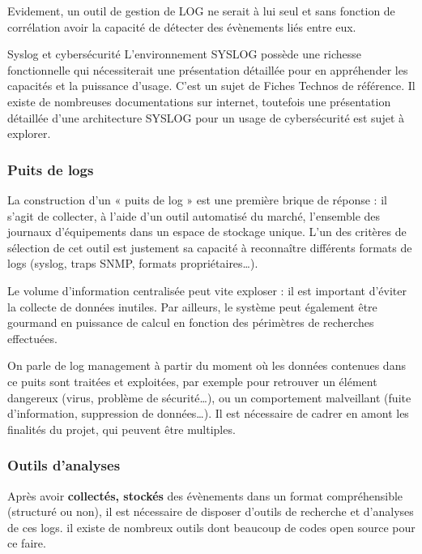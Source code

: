  Evidement, un outil de gestion de LOG ne serait à lui seul et sans fonction de corrélation avoir la capacité de détecter des évènements liés entre eux. 
 
\begin{warningbox}{Syslog et cybersécurité}
	L'environnement SYSLOG possède une richesse fonctionnelle qui nécessiterait une présentation détaillée pour en appréhender les capacités et la puissance d'usage. C'est un sujet de Fiches Technos de référence. Il existe de nombreuses documentations sur internet, toutefois une présentation détaillée d'une architecture SYSLOG pour un usage de cybersécurité est sujet à explorer. 
\end{warningbox}

\subsubsection{Puits de logs}

La construction d’un « puits de log » est une première brique de réponse : il s’agit de collecter, à l’aide d’un outil automatisé du marché, l’ensemble des journaux d’équipements dans un espace de stockage unique. L’un des critères de sélection de cet outil est justement sa capacité à reconnaître différents formats de logs (syslog, traps SNMP, formats propriétaires…).

Le volume d’information centralisée peut vite exploser : il est important d’éviter la collecte de données inutiles. Par ailleurs, le système peut également être gourmand en puissance de calcul en fonction des périmètres de recherches effectuées.

On parle de log management à partir du moment où les données contenues dans ce puits sont traitées et exploitées, par exemple pour retrouver un élément dangereux (virus, problème de sécurité…), ou un comportement malveillant (fuite d’information, suppression de données…). Il est nécessaire de cadrer en amont les finalités du projet,  qui peuvent être multiples.

\subsubsection{Outils d'analyses}

Après avoir \textbf{collectés, stockés} des évènements dans un format compréhensible (structuré ou non), il est nécessaire de disposer d'outils de recherche et d'analyses de ces logs. il existe de nombreux outils  dont beaucoup de codes open source pour ce faire.


